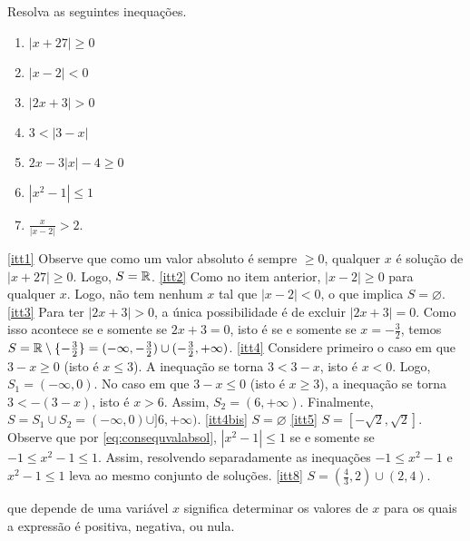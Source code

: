 \begin{exo}
Resolva as seguintes inequações.
\begin{multicols}{3}
\begin{enumerate}
\item\label{itt1} $|x+27|\geq 0$
\item\label{itt2} $|x-2|<0$
\item\label{itt3} $|2x+3|>0$
\item\label{itt4} $3<|3-x|$
\item\label{itt4bis} $2x-3|x|-4\geq 0$
\item\label{itt5} $|x^2-1|\leq 1$
\item\label{itt7} $\frac{x}{|x-2|}>2$.
\end{enumerate}
\end{multicols}
\vspace{0.01cm}
\begin{sol}
\eqref{itt1} Observe que como um valor absoluto é sempre $\geq 0$, 
qualquer $x$ é solução de $|x+27|\geq 0$. Logo, $S=\mathbb{R}$. \eqref{itt2} Como no
item anterior, $|x-2|\geq 0$ para qualquer $x$. Logo, não tem nenhum $x$ tal que
$|x-2|<0$, o que implica $S=\varnothing$. \eqref{itt3} Para ter $|2x+3|>0$, a
única possibilidade é de excluir $|2x+3|=0$. Como isso acontece se e somente se
$2x+3=0$, isto é se e somente se $x=-\tfrac32$, temos $S=\mathbb{R}\setminus
\{-\tfrac32\}=(-\infty,-\tfrac32)\cup(-\tfrac32,+\infty)$.
\eqref{itt4} Considere primeiro o caso em que $3-x\geq 0$ (isto é $x\leq 3$). A inequação
se torna $3<3-x$, isto é $x<0$. Logo, $S_1=(-\infty,0)$. No caso em que $3-x\leq 0$ (isto
é $x\geq 3$), a inequação se torna $3<-(3-x)$, isto é $x>6$. Assim, $S_2=(6,+\infty)$.
Finalmente, $S=S_1\cup S_2=(-\infty,0)\cup ]6,+\infty)$.
\eqref{itt4bis} $S=\varnothing$
\eqref{itt5} $S=[-\sqrt{2},\sqrt{2}]$. Observe que por
\eqref{eq:consequvalabsol}, $|x^2-1|\leq 1$ se e somente se
$-1\leq x^2-1\leq 1$. Assim, resolvendo separadamente as inequações $-1\leq x^2-1$ e
$x^2-1\leq 1$ leva ao mesmo conjunto de soluções. 
\eqref{itt8} $S=(\tfrac43,2)\cup (2,4)$.
\end{sol}
\end{exo}

 que depende de uma variável $x$ significa
determinar os valores de $x$ para os quais a expressão é positiva, negativa, ou
nula.

